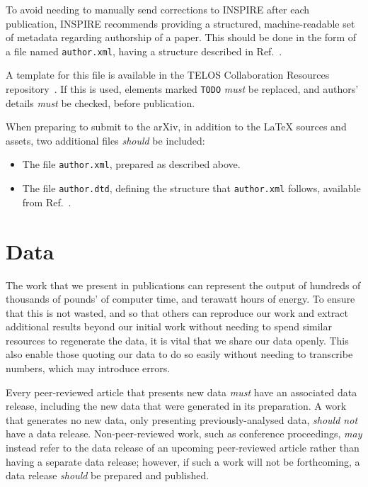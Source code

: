 \documentclass{article}
\newcommand\rfcword[1]{\emph{#1}\xspace}
\newcommand\must{\rfcword{must}}
\newcommand\should{\rfcword{should}}
\newcommand\shouldnot{\rfcword{should not}}
\newcommand\may{\rfcword{may}}
\newcommand\filename[1]{\texttt{#1}\xspace}
\newcommand\authorxml{\filename{author.xml}\xspace}
\begin{document}
To avoid needing to manually send corrections to INSPIRE after each publication,
INSPIRE recommends providing
a structured, machine-readable set of metadata regarding authorship of a paper.
This should be done in the form of a file named \authorxml,
having a structure described in Ref.~\cite{inspire-authorxml}.

A template for this file is available in the TELOS Collaboration Resources repository~\cite{resources}.
If this is used,
elements marked \verb|TODO| \must be replaced,
and authors' details \must be checked,
before publication.

When preparing to submit to the arXiv,
in addition to the LaTeX sources and assets,
two additional files \should be included:

\begin{itemize}
  \item
        The file \authorxml,
        prepared as described above.
  \item
        The file \filename{author.dtd},
        defining the structure that \authorxml follows,
        available from Ref.~\cite{inspire-authorxml}.
\end{itemize}

\section{Data}\label{sec:data}

The work that we present in publications can represent
the output of hundreds of thousands of pounds' of computer time,
and terawatt hours of energy.
To ensure that this is not wasted,
and so that others can reproduce our work
and extract additional results beyond our initial work
without needing to spend similar resources to regenerate the data,
it is vital that we share our data openly.
This also enable those quoting our data to do so easily
without needing to transcribe numbers,
which may introduce errors.

Every peer-reviewed article that presents new data
\must have an associated data release,
including the new data that were generated in its preparation.
A work that generates no new data,
only presenting previously-analysed data,
\shouldnot have a data release.
Non-peer-reviewed work,
such as conference proceedings,
\may instead refer to
the data release of an upcoming peer-reviewed article
rather than having a separate data release;
however,
if such a work will not be forthcoming,
a data release \should be prepared and published.
\end{document}
